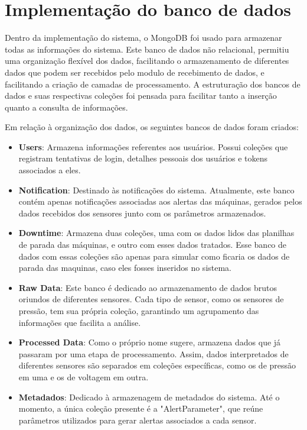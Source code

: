 \section[Implementação do banco de dados]{Implementação do banco de dados}


Dentro da implementação do sistema, o MongoDB foi usado para armazenar todas as informações do sistema. Este banco de dados não relacional, permitiu uma organização flexível dos dados, facilitando o armazenamento de diferentes dados que podem ser recebidos pelo modulo de recebimento de dados, e facilitando a criação de camadas de processamento. A estruturação dos bancos de dados e suas respectivas coleções foi pensada para facilitar tanto a inserção quanto a consulta de informações.

Em relação à organização dos dados, os seguintes bancos de dados foram criados:

\begin{itemize}
    \item \textbf{Users}: Armazena informações referentes aos usuários. Possui coleções que registram tentativas de login, detalhes pessoais dos usuários e tokens associados a eles.
    
    \item \textbf{Notification}: Destinado às notificações do sistema. Atualmente, este banco contém apenas notificações associadas aos alertas das máquinas, gerados pelos dados recebidos dos sensores junto com os parâmetros armazenados.
    
    \item \textbf{Downtime}: Armazena duas coleções, uma com os dados lidos das planilhas de parada das máquinas, e outro com esses dados tratados. Esse banco de dados com essas coleções são apenas para simular como ficaria os dados de parada das maquinas, caso eles fosses inseridos no sistema.
    
    \item \textbf{Raw Data}: Este banco é dedicado ao armazenamento de dados brutos oriundos de diferentes sensores. Cada tipo de sensor, como os sensores de pressão, tem sua própria coleção, garantindo um agrupamento das informações que facilita a análise.
    
    \item \textbf{Processed Data}: Como o próprio nome sugere, armazena dados que já passaram por uma etapa de processamento. Assim, dados interpretados de diferentes sensores são separados em coleções específicas, como os de pressão em uma e os de voltagem em outra.
    
    \item \textbf{Metadados}: Dedicado à armazenagem de metadados do sistema. Até o momento, a única coleção presente é a "AlertParameter", que reúne parâmetros utilizados para gerar alertas associados a cada sensor.
\end{itemize}

